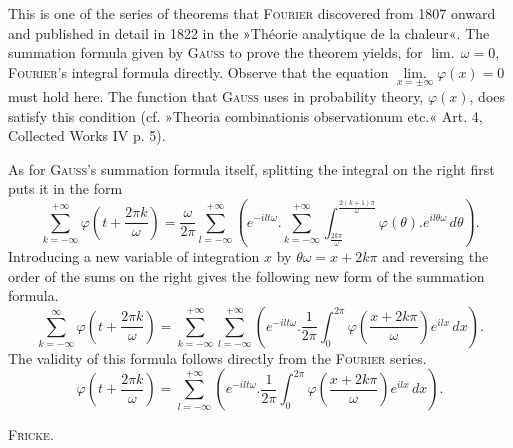 %

\noindent This is one of the series of theorems that \textsc{Fourier} discovered from 1807 onward and published in detail in 1822 in the »Théorie analytique de la chaleur«. The summation formula given by \textsc{Gauss} to prove the theorem yields, for $\operatorname{lim.}\,\omega=0$, \textsc{Fourier}'s integral formula directly. Observe that the equation $\mathop{\mathrm{lim.}}\limits_{x=\pm\infty}\varphi(x)=0$ must hold here. The function that \textsc{Gauss} uses in probability theory, $\varphi(x)$, does satisfy this condition (cf. »Theoria combinationis observationum etc.« Art. 4, Collected Works IV p. 5).

As for \textsc{Gauss}'s summation formula itself, splitting the integral on the right first puts it in the form
\[
\sum^{+\infty}_{k=-\infty}\varphi\!\left(t+\frac{2\pi k}{\omega}\right) = \frac{\omega}{2\pi}\sum^{+\infty}_{l=-\infty}\left(e^{-ilt\omega}\mathord{.}\sum^{+\infty}_{k=-\infty}\int^{\frac{2(k+1)\pi}{\omega}}_{\frac{2k\pi}{\omega}}\varphi(\theta)\mathord{.} e^{il\theta\omega}\,d\theta\right).
\]
\noindent Introducing a new variable of integration $x$ by $\theta\omega = x+2k\pi$ and reversing the order of the sums on the right gives the following new form of the summation formula.
\[
\sum^{\infty}_{k=-\infty}\varphi\!\left(t+\frac{2\pi k}{\omega}\right) = \sum^{+\infty}_{k=-\infty}\sum^{+\infty}_{l=-\infty}\left(e^{-ilt\omega}\mathord{.}\frac{1}{2\pi}\int^{2\pi}_{0}\varphi\!\left(\frac{x+2k\pi}{\omega}\right)e^{ilx}\,dx\right).
\]
\noindent The validity of this formula follows directly from the \textsc{Fourier} series.
\[
\varphi\!\left(t+\frac{2\pi k}{\omega}\right) = \sum^{+\infty}_{l=-\infty}\left(e^{-ilt\omega}\mathord{.}\frac{1}{2\pi}\int^{2\pi}_{0}\varphi\!\left(\frac{x+2k\pi}{\omega}\right)e^{ilx}\,dx\right).
\]

\begin{flushright}
\textsc{Fricke}.
\end{flushright}

